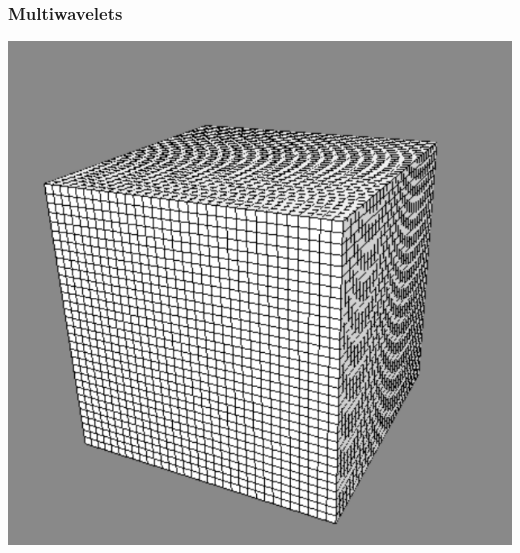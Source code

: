 \begin{frame}
\frametitle{Multiwavelets}
\centering
\includegraphics[scale=0.35]{figures/unifgrid.pdf}
\end{frame}

